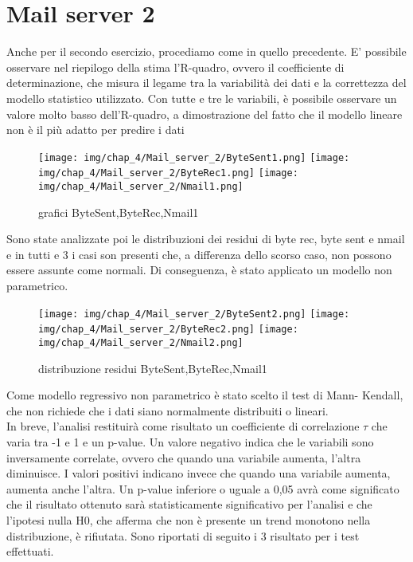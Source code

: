 \section{Mail server 2}
Anche per il secondo esercizio, procediamo come in quello precedente.
E' possibile osservare nel riepilogo della stima l’R-quadro, ovvero il coefficiente di determinazione, che misura il legame tra la variabilità dei dati e la correttezza
del modello statistico utilizzato.
Con tutte e tre le variabili, è possibile osservare un valore molto basso dell'R-quadro, a dimostrazione del fatto che il modello lineare non è il più adatto per predire i dati
\begin{figure}[H]
    \centering
    \texttt{[image: img/chap\_4/Mail\_server\_2/ByteSent1.png]}
    \texttt{[image: img/chap\_4/Mail\_server\_2/ByteRec1.png]}
    \texttt{[image: img/chap\_4/Mail\_server\_2/Nmail1.png]}
    \caption{grafici ByteSent,ByteRec,Nmail1}
    \label{fig:sis_2_25_k}
\end{figure}
\noindent
Sono state analizzate poi le distribuzioni dei residui di byte
rec, byte sent e nmail e in tutti e 3 i casi son presenti che, a differenza dello scorso caso, non possono essere assunte come normali.
Di conseguenza, è stato applicato un modello non parametrico.
\begin{figure}[H]
    \centering
    \texttt{[image: img/chap\_4/Mail\_server\_2/ByteSent2.png]}
    \texttt{[image: img/chap\_4/Mail\_server\_2/ByteRec2.png]}
    \texttt{[image: img/chap\_4/Mail\_server\_2/Nmail2.png]}
    \caption{distribuzione residui ByteSent,ByteRec,Nmail1}
    \label{fig:sis_2_25_k}
\end{figure}
\noindent
Come modello regressivo non parametrico è stato scelto il test di Mann-
Kendall, che non richiede che i dati siano normalmente distribuiti o lineari.\\
In breve, l’analisi restituirà come risultato un coefficiente di correlazione $\tau$ che varia tra -1 e 1 e un p-value. Un valore negativo indica che le variabili sono inversamente correlate, ovvero che quando una variabile aumenta, l’altra
diminuisce. I valori positivi indicano invece che quando una variabile aumenta,
aumenta anche l’altra.
Un p-value inferiore o uguale a 0,05 avrà come significato che il risultato ottenuto sarà
statisticamente significativo per l’analisi e che l’ipotesi nulla H0, che afferma
che non è presente un trend monotono nella distribuzione, è rifiutata.
Sono riportati di seguito i 3 risultato per i test effettuati.

